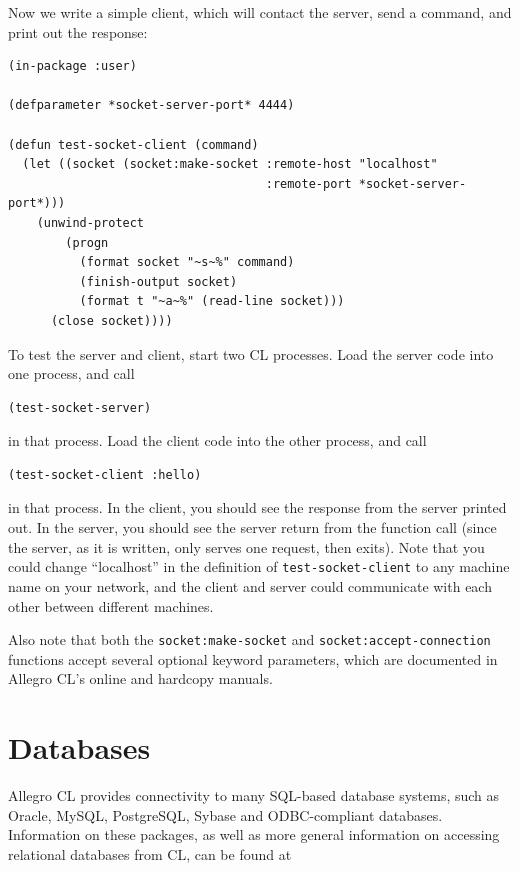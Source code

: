 Now we write a simple client, which will contact the server, send a command, and print
out the response:

\begin{verbatim}
(in-package :user)

(defparameter *socket-server-port* 4444)

(defun test-socket-client (command)
  (let ((socket (socket:make-socket :remote-host "localhost"
                                    :remote-port *socket-server-port*)))
    (unwind-protect
        (progn
          (format socket "~s~%" command)
          (finish-output socket)
          (format t "~a~%" (read-line socket)))
      (close socket))))
\end{verbatim}

To test the server and client, start two CL processes. Load the server code into one process,
and call

\begin{verbatim}
(test-socket-server)
\end{verbatim}

in that process. Load the client code into the other process, and call

\begin{verbatim}
(test-socket-client :hello)
\end{verbatim}

in that process. In the client, you should see the response from the server printed out. In
the server, you should see the server return from the function call (since the server, as it is
written, only serves one request, then exits). Note that you could change ``localhost'' in the
definition of \texttt{test-socket-client} to any machine name on your network, and the client
and server could communicate with each other between different machines.

Also note that both the \texttt{socket:make-socket} and \texttt{socket:accept-connection} functions accept several optional keyword parameters, which are documented in Allegro CL's
online and hardcopy manuals.

\section{Databases}

Allegro CL provides connectivity to many SQL-based database systems, such as Oracle,
MySQL, PostgreSQL, Sybase and ODBC-compliant databases. Information on these packages, as well as more general information on accessing relational databases from CL, can be
found at

